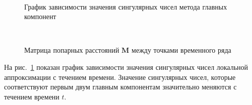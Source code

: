 \documentclass[12pt, twoside]{article}
\begin{document}
\begin{figure}[h!t]\center
{}
\\
\caption{График зависимости значения сингулярных чисел метода главных компонент}
\label{fig_synthetic_lambda}
\end{figure}

\begin{figure}[h!t]\center
{}
\\
\caption{Матрица попарных расстояний $\textbf{M}$ между точками временного ряда}
\label{fig_synthetic_distance}
\end{figure}

На рис.~\ref{fig_synthetic_lambda} показан график зависимости значения сингулярных чисел локальной аппроксимации с течением времени. Значение сингулярных чисел, которые соответствуют первым двум главным компонентам значительно меняются с течением времени $t$. 
\end{document}
